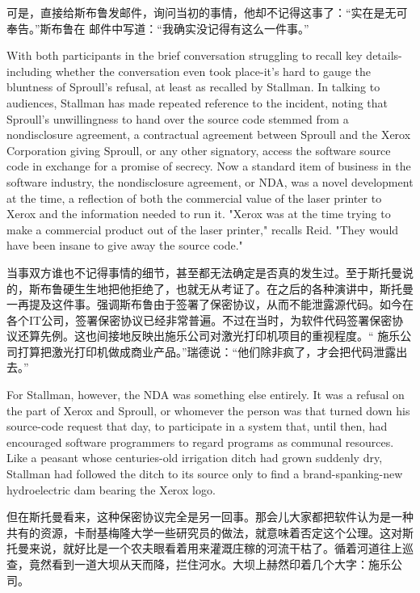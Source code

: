 \ifdefined\chs
可是，直接给斯布鲁发邮件，询问当初的事情，他却不记得这事了：``实在是无可奉告。''斯布鲁在
邮件中写道：``我确实没记得有这么一件事。''
\fi


\ifdefined\eng
With both participants in the brief conversation struggling to recall key details-including whether the conversation even took place-it's hard to gauge the bluntness of Sproull's refusal, at least as recalled by Stallman. In talking to audiences, Stallman has made repeated reference to the incident, noting that Sproull's unwillingness to hand over the source code stemmed from a nondisclosure agreement, a contractual agreement between Sproull and the Xerox Corporation giving Sproull, or any other signatory, access the software source code in exchange for a promise of secrecy. Now a standard item of business in the software industry, the nondisclosure agreement, or NDA, was a novel development at the time, a reflection of both the commercial value of the laser printer to Xerox and the information needed to run it. "Xerox was at the time trying to make a commercial product out of the laser printer," recalls Reid. "They would have been insane to give away the source code."
\fi

\ifdefined\chs
当事双方谁也不记得事情的细节，甚至都无法确定是否真的发生过。至于斯托曼说的，斯布鲁硬生生地把他拒绝了，也就无从考证了。在之后的各种演讲中，斯托曼一再提及这件事。强调斯布鲁由于签署了保密协议，从而不能泄露源代码。如今在各个IT公司，签署保密协议已经非常普遍。不过在当时，为软件代码签署保密协议还算先例。这也间接地反映出施乐公司对激光打印机项目的重视程度。``
施乐公司打算把激光打印机做成商业产品。''瑞德说：``他们除非疯了，才会把代码泄露出去。''
\fi

\ifdefined\eng
For Stallman, however, the NDA was something else entirely. It was a refusal on the part of Xerox and Sproull, or whomever the person was that turned down his source-code request that day, to participate in a system that, until then, had encouraged software programmers to regard programs as communal resources. Like a peasant whose centuries-old irrigation ditch had grown suddenly dry, Stallman had followed the ditch to its source only to find a brand-spanking-new hydroelectric dam bearing the Xerox logo.
\fi

\ifdefined\chs
但在斯托曼看来，这种保密协议完全是另一回事。那会儿大家都把软件认为是一种共有的资源，卡耐基梅隆大学一些研究员的做法，就意味着否定这个公理。这对斯托曼来说，就好比是一个农夫眼看着用来灌溉庄稼的河流干枯了。循着河道往上巡查，竟然看到一道大坝从天而降，拦住河水。大坝上赫然印着几个大字：施乐公司。
\fi

